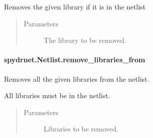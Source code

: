 \documentclass[letterpaper,10pt,english,openany,oneside]{sphinxmanual}
\begin{document}
\begin{fulllineitems}
\label{\detokenize{reference/classes/generated/spydrnet.Netlist.remove_library:spydrnet.Netlist.remove_library}}
Removes the given library if it is in the netlist
\begin{quote}\begin{description}
\item[{Parameters}] \leavevmode
{} \textendash{} The library to be removed.

\end{description}\end{quote}

\end{fulllineitems}



\paragraph{spydrnet.Netlist.remove\_libraries\_from}
\label{\detokenize{reference/classes/generated/spydrnet.Netlist.remove_libraries_from:spydrnet-netlist-remove-libraries-from}}\label{\detokenize{reference/classes/generated/spydrnet.Netlist.remove_libraries_from::doc}}

\begin{fulllineitems}
\label{\detokenize{reference/classes/generated/spydrnet.Netlist.remove_libraries_from:spydrnet.Netlist.remove_libraries_from}}
Removes all the given libraries from the netlist.

All libraries must be in the netlist.
\begin{quote}\begin{description}
\item[{Parameters}] \leavevmode
{} \textendash{} Libraries to be removed.

\end{description}\end{quote}

\end{fulllineitems}
\end{document}
